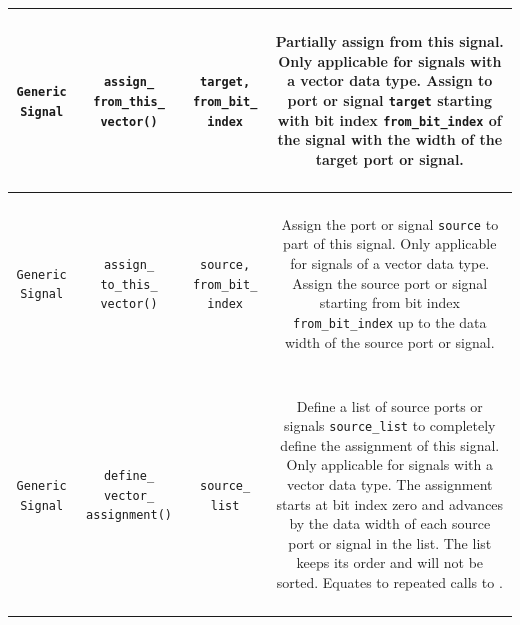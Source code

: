 \begin{longtable}[htbp]{|c|c|c|c|}
\parbox{2.5cm}{~\\ \texttt{Generic Signal}\\~} & \parbox{3cm}{~\\ \texttt{assign\_ from\_this\_ vector()}\\~} & \parbox{3cm}{~ \\ \texttt{target, from\_bit\_ index} \\ ~} & \parbox{6cm}{~\\ Partially assign from this signal. Only applicable for signals with a vector data type. Assign to port or signal \texttt{target} starting with bit index \texttt{from\_bit\_index} of the signal with the width of the target port or signal. \\~}\\
\hline
\parbox{2.5cm}{~\\ \texttt{Generic Signal}\\~} & \parbox{3cm}{~\\ \texttt{assign\_ to\_this\_ vector()}\\~} & \parbox{3cm}{~ \\ \texttt{source, from\_bit\_ index} \\ ~} & \parbox{6cm}{~\\ Assign the port or signal \texttt{source} to part of this signal. Only applicable for signals of a vector data type. Assign the source port or signal starting from bit index \texttt{from\_bit\_index} up to the data width of the source port or signal. \\~}\\
\hline
\parbox{2.5cm}{~\\ \texttt{Generic Signal}\\~} & \parbox{3cm}{~\\ \texttt{define\_ vector\_ assignment()}\\~} & \parbox{3cm}{~ \\ \texttt{source\_ list} \\ ~} & \parbox{6cm}{~\\ Define a list of source ports or signals \texttt{source\_list} to completely define the assignment of this signal. Only applicable for signals with a vector data type. The assignment starts at bit index zero and advances by the data width of each source port or signal in the list. The list keeps its order and will not be sorted. Equates to repeated calls to . \\~}\\
\hline


\end{longtable}
